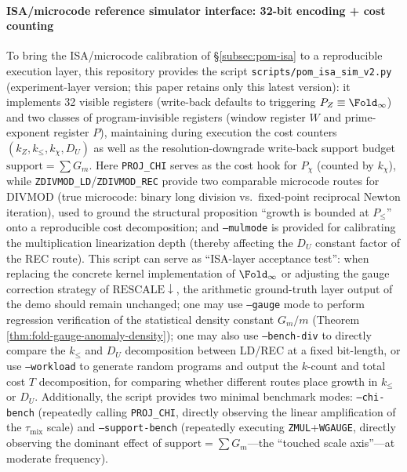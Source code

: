 \paragraph{ISA/microcode reference simulator interface: 32-bit encoding + cost counting}
To bring the ISA/microcode calibration of \S\ref{subsec:pom-isa} to a reproducible execution layer, this repository provides the script
\texttt{scripts/pom\_isa\_sim\_v2.py} (experiment-layer version; this paper retains only this latest version):
it implements 32 visible registers (write-back defaults to triggering \(P_Z\equiv\Fold_\infty\)) and two classes of program-invisible registers (window register \(W\) and prime-exponent register \(P\)), maintaining during execution the cost counters
\((k_Z,k_{\le},k_\chi,D_U)\)
as well as the resolution-downgrade write-back support budget
\(\mathrm{support}=\sum G_m\).
Here \texttt{PROJ\_CHI} serves as the cost hook for \(P_\chi\) (counted by \(k_\chi\)), while \texttt{ZDIVMOD\_LD}/\texttt{ZDIVMOD\_REC} provide two comparable microcode routes for DIVMOD (true microcode: binary long division vs.\ fixed-point reciprocal Newton iteration), used to ground the structural proposition ``growth is bounded at \(P_{\le}\)'' onto a reproducible cost decomposition; and \texttt{--mulmode} is provided for calibrating the multiplication linearization depth (thereby affecting the \(D_U\) constant factor of the REC route).
This script can serve as ``ISA-layer acceptance test'': when replacing the concrete kernel implementation of \(\Fold_\infty\) or adjusting the gauge correction strategy of \(\mathrm{RESCALE}\downarrow\), the arithmetic ground-truth layer output of the demo should remain unchanged; one may use \texttt{--gauge} mode to perform regression verification of the statistical density constant \(G_m/m\) (Theorem \ref{thm:fold-gauge-anomaly-density}); one may also use \texttt{--bench-div} to directly compare the \(k_{\le}\) and \(D_U\) decomposition between LD/REC at a fixed bit-length, or use \texttt{--workload} to generate random programs and output the \(k\)-count and total cost \(T\) decomposition, for comparing whether different routes place growth in \(k_{\le}\) or \(D_U\).
Additionally, the script provides two minimal benchmark modes: \texttt{--chi-bench} (repeatedly calling \texttt{PROJ\_CHI}, directly observing the linear amplification of the \(\tau_{\mathrm{mix}}\) scale) and \texttt{--support-bench} (repeatedly executing \texttt{ZMUL}+\texttt{WGAUGE}, directly observing the dominant effect of \(\mathrm{support}=\sum G_m\)---the ``touched scale axis''---at moderate frequency).

